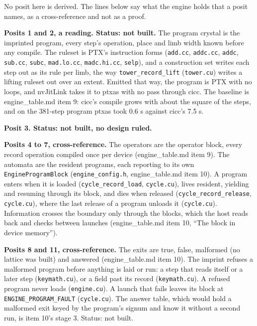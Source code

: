 No posit here is derived. The lines below say what the engine holds that a posit names, as a cross-reference and not as a proof.

\textbf{Posits 1 and 2, a reading. Status: not built.} The program crystal is the imprinted program, every step's operation, place and limb width known before any compile. The ruleset is PTX's instruction forms (\texttt{add.\allowbreak{}cc}, \texttt{addc.\allowbreak{}cc}, \texttt{addc}, \texttt{sub.\allowbreak{}cc}, \texttt{subc}, \texttt{mad.\allowbreak{}lo.\allowbreak{}cc}, \texttt{madc.\allowbreak{}hi.\allowbreak{}cc}, \texttt{selp}), and a construction set writes each step out as its rule per limb, the way \texttt{tower\_\allowbreak{}record\_\allowbreak{}lift} (\texttt{tower.\allowbreak{}cu}) writes a lifting ruleset out over an extent. Emitted that way, the program is PTX with no loops, and nvJitLink takes it to ptxas with no pass through cicc. The baseline is engine\_\allowbreak{}table.md item 9: cicc's compile grows with about the square of the steps, and on the 381-step program ptxas took 0.6 s against cicc's 7.5 s.

\textbf{Posit 3. Status: not built, no design ruled.}

\textbf{Posits 4 to 7, cross-reference.} The operators are the operator block, every record operation compiled once per device (engine\_\allowbreak{}table.md item 9). The automata are the resident programs, each reporting to its own \texttt{Engine\allowbreak{}Program\allowbreak{}Block} (\texttt{engine\_\allowbreak{}config.\allowbreak{}h}, engine\_\allowbreak{}table.md item 10). A program enters when it is loaded (\texttt{cycle\_\allowbreak{}record\_\allowbreak{}load}, \texttt{cycle.\allowbreak{}cu}), lives resident, yielding and resuming through its block, and dies when released (\texttt{cycle\_\allowbreak{}record\_\allowbreak{}release}, \texttt{cycle.\allowbreak{}cu}), where the last release of a program unloads it (\texttt{cycle.\allowbreak{}cu}). Information crosses the boundary only through the blocks, which the host reads back and checks between launches (engine\_\allowbreak{}table.md item 10, “The block in device memory”).

\textbf{Posits 8 and 11, cross-reference.} The exits are true, false, malformed (no lattice was built) and answered (engine\_\allowbreak{}table.md item 10). The imprint refuses a malformed program before anything is laid or run: a step that reads itself or a later step (\texttt{keymath.\allowbreak{}cu}), or a field past its record (\texttt{keymath.\allowbreak{}cu}). A refused program never loads (\texttt{engine.\allowbreak{}cu}). A launch that fails leaves its block at \texttt{ENGINE\_\allowbreak{}PROGRAM\_\allowbreak{}FAULT} (\texttt{cycle.\allowbreak{}cu}). The answer table, which would hold a malformed exit keyed by the program's signum and know it without a second run, is item 10's stage 3. Status: not built.

